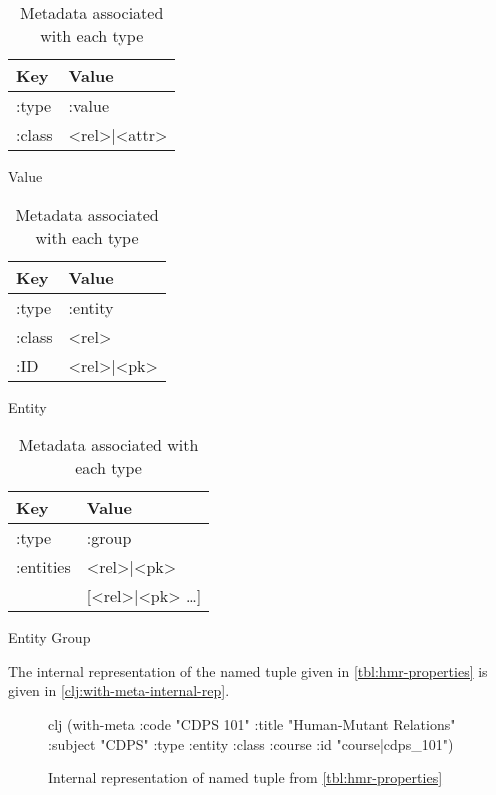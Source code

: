 			\begin{table}
				\begin{subtable}[b]{0.33\linewidth}
					\centering
					
					\begin{tabular}{ll}
						\toprule
						Key & Value \\
						\midrule
						:type & :value \\
						:class & <rel>|<attr> \\
						\bottomrule
					\end{tabular}
					
					\caption{Value}
				\end{subtable}
				\begin{subtable}[b]{0.33\linewidth}
					\centering
					
					\begin{tabular}{ll}
						\toprule
						Key & Value \\
						\midrule
						:type & :entity \\
						:class & <rel> \\
						:ID & <rel>|<pk> \\
						\bottomrule
					\end{tabular}
					
					\caption{Entity}
				\end{subtable}
				\begin{subtable}[b]{0.33\linewidth}
					\centering
					
					\begin{tabular}{ll}
						\toprule
						Key & Value \\
						\midrule
						:type & :group \\
						:entities & <rel>|<pk> \\
						 & [<rel>|<pk> \ldots] \\
						\bottomrule
					\end{tabular}
					
					\caption{Entity Group}
				\end{subtable}
				
				\caption{Metadata associated with each type}
				\label{tbl:type-metadata}
			\end{table}
			
			The internal representation of the named tuple given in \vref{tbl:hmr-properties} is given in \vref{clj:with-meta-internal-rep}.
			
			\begin{figure}
				\begin{singlespaced}
					\begin{pygments}{clj}
(with-meta
  {:code    "CDPS 101"
   :title   "Human-Mutant Relations"
   :subject "CDPS"}
  {:type  :entity
   :class :course
   :id    "course|cdps_101"})
					\end{pygments}
				\end{singlespaced}
				
				\caption{Internal representation of named tuple from \vref{tbl:hmr-properties}}
				\label{clj:with-meta-internal-rep}
			\end{figure}
			
